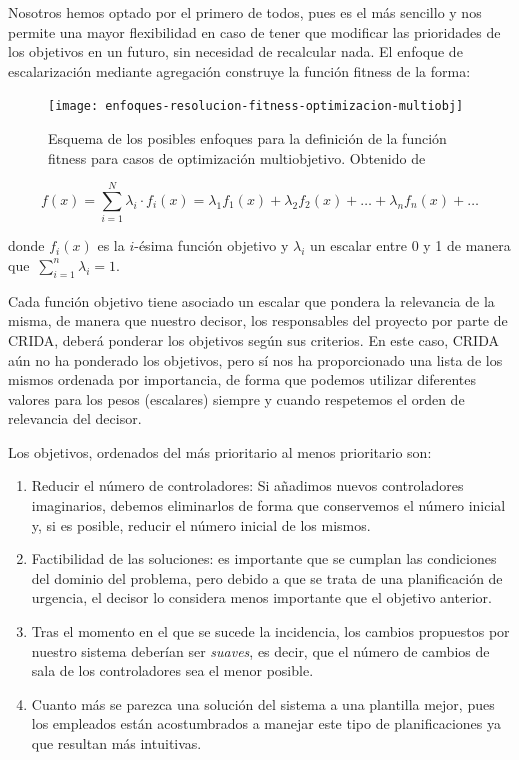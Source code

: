 Nosotros hemos optado por el primero de todos, pues es el más sencillo y nos permite una mayor flexibilidad en caso de tener que modificar las prioridades de los objetivos en un futuro, sin necesidad de recalcular nada. El enfoque de escalarización mediante agregación construye la función fitness de la forma:

\begin{figure}
    \centering
    \texttt{[image: enfoques-resolucion-fitness-optimizacion-multiobj]}
    \caption[Esquema de los posibles enfoques para la definición de la función fitness para casos de optimización multiobjetivo]{Esquema de los posibles enfoques para la definición de la función fitness para casos de optimización multiobjetivo. Obtenido de~\cite{sota:metaheuristicas-design-impl}}
    \label{fig:enfoques-fitness-multiobj}
\end{figure}
%
\[
    f(x) = \sum_{i=1}^{N} \lambda_i \cdot f_i(x) = \lambda_1 f_1(x) + \lambda_2 f_2(x) + \dots + \lambda_n f_n(x) + \dots
\]

donde $f_i(x)$ es la $i$-ésima función objetivo y $\lambda_i$ un escalar entre 0 y 1 de manera que~$\sum_{i=1}^n \lambda_i = 1$.

Cada función objetivo tiene asociado un escalar que pondera la relevancia de la misma, de manera que nuestro decisor, los responsables del proyecto por parte de \gls{CRIDA}, deberá ponderar los objetivos según sus criterios. En este caso, CRIDA aún no ha ponderado los objetivos, pero sí nos ha proporcionado una lista de los mismos ordenada por importancia, de forma que podemos utilizar diferentes valores para los pesos (escalares) siempre y cuando respetemos el orden de relevancia del decisor.

Los objetivos, ordenados del más prioritario al menos prioritario son:

\begin{enumerate}[label={O\arabic*}]
    \item \label{O1} Reducir el número de controladores: Si añadimos nuevos controladores imaginarios, debemos eliminarlos de forma que conservemos el número inicial y, si es posible, reducir el número inicial de los mismos.

    \item \label{O2} Factibilidad de las soluciones: es importante que se cumplan las condiciones del dominio del problema, pero debido a que se trata de una planificación de urgencia, el decisor lo considera menos importante que el objetivo anterior.

    \item \label{O3} Tras el momento en el que se sucede la incidencia, los cambios propuestos por nuestro sistema deberían ser \textit{suaves}, es decir, que el número de cambios de sala de los controladores sea el menor posible.

    \item \label{O4} Cuanto más se parezca una solución del sistema a una plantilla mejor, pues los empleados están acostumbrados a manejar este tipo de planificaciones ya que resultan más intuitivas.
\end{enumerate}

